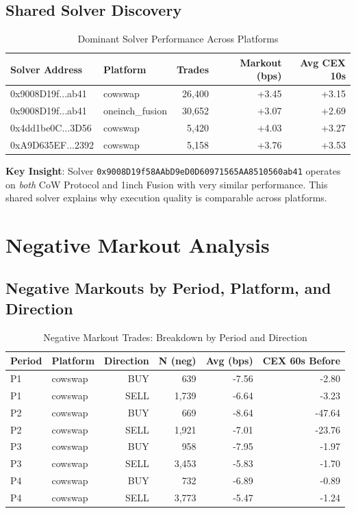 \documentclass[11pt,a4paper]{article}
\begin{document}
\subsection{Shared Solver Discovery}

\begin{table}[H]
\centering
\caption{Dominant Solver Performance Across Platforms}
\begin{tabular}{llrrr}
\toprule
\textbf{Solver Address} & \textbf{Platform} & \textbf{Trades} & \textbf{Markout (bps)} & \textbf{Avg CEX 10s} \\
\midrule
0x9008D19f...ab41 & cowswap & 26,400 & +3.45 & +3.15 \\
0x9008D19f...ab41 & oneinch\_fusion & 30,652 & +3.07 & +2.69 \\
0x4dd1be0C...3D56 & cowswap & 5,420 & +4.03 & +3.27 \\
0xA9D635EF...2392 & cowswap & 5,158 & +3.76 & +3.53 \\
\bottomrule
\end{tabular}
\end{table}

\textbf{Key Insight}: Solver \texttt{0x9008D19f58AAbD9eD0D60971565AA8510560ab41} operates on \textit{both} CoW Protocol and 1inch Fusion with very similar performance. This shared solver explains why execution quality is comparable across platforms.

\section{Negative Markout Analysis}

\subsection{Negative Markouts by Period, Platform, and Direction}

\begin{table}[H]
\centering
\caption{Negative Markout Trades: Breakdown by Period and Direction}
\begin{tabular}{llrrrr}
\toprule
\textbf{Period} & \textbf{Platform} & \textbf{Direction} & \textbf{N (neg)} & \textbf{Avg (bps)} & \textbf{CEX 60s Before} \\
\midrule
P1 & cowswap & BUY & 639 & -7.56 & -2.80 \\
P1 & cowswap & SELL & 1,739 & -6.64 & -3.23 \\
P2 & cowswap & BUY & 669 & -8.64 & -47.64 \\
P2 & cowswap & SELL & 1,921 & -7.01 & -23.76 \\
P3 & cowswap & BUY & 958 & -7.95 & -1.97 \\
P3 & cowswap & SELL & 3,453 & -5.83 & -1.70 \\
P4 & cowswap & BUY & 732 & -6.89 & -0.89 \\
P4 & cowswap & SELL & 3,773 & -5.47 & -1.24 \\
\bottomrule
\end{tabular}
\end{table}
\end{document}
